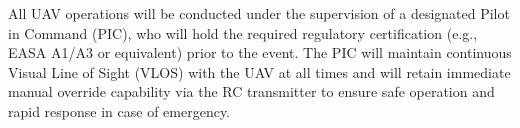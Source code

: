 
All UAV operations will be conducted under the supervision of a designated Pilot in Command (PIC), who will hold the required regulatory certification (e.g., EASA A1/A3 or equivalent) prior to the event. The PIC will maintain continuous Visual Line of Sight (VLOS) with the UAV at all times and will retain immediate manual override capability via the RC transmitter to ensure safe operation and rapid response in case of emergency.